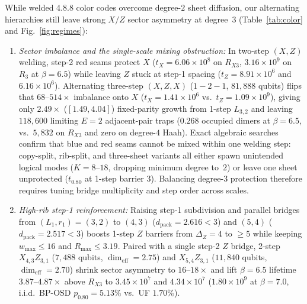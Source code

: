 \documentclass[aps,prx,reprint,superscriptaddress,nofootinbib,floatfix]{revtex4-2}
\begin{document}
While welded 4.8.8 color codes overcome degree-$2$ sheet diffusion, our alternating hierarchies still leave strong $X/Z$ sector asymmetry at degree~$3$ (Table~\ref{tab:color} and Fig.~\ref{fig:regimes}):
\begin{enumerate}
  \item \emph{Sector imbalance and the single-scale mixing obstruction:} In two-step $(X, Z)$ welding, step-2 red seams protect $X$ ($t_X = 6.06 \times 10^8$ on $R_{X3}$, $3.16 \times 10^9$ on $R_3$ at $\beta = 6.5$) while leaving $Z$ stuck at step-1 spacing ($t_Z = 8.91 \times 10^6$ and $6.16 \times 10^6$). Alternating three-step $(X, Z, X)$ ($1{-}2{-}1$, $81{,}888$ qubits) flips that $68\text{--}514\times$ imbalance onto $X$ ($t_X = 1.41 \times 10^6$ vs.\ $t_Z = 1.09 \times 10^9$), giving only $2.49\times$ ($[1.49, 4.04]$) fixed-parity growth from 1-step $L_{3,2}$ and leaving $118{,}600$ limiting $E = 2$ adjacent-pair traps ($0.268$ occupied dimers at $\beta = 6.5$, vs.\ $5{,}832$ on $R_{X3}$ and zero on degree-$4$ Haah). Exact algebraic searches confirm that blue and red seams cannot be mixed within one welding step: copy-split, rib-split, and three-sheet variants all either spawn unintended logical modes ($K = 8\text{--}18$, dropping minimum degree to~$2$) or leave one sheet unprotected ($t_{0.80}$ at 1-step barrier $3$). Balancing degree-$3$ protection therefore requires tuning bridge multiplicity and step order across scales.
  \item \emph{High-rib step-1 reinforcement:} Raising step-1 subdivision and parallel bridges from $(L_1, r_1) = (3, 2)$ to $(4, 3)$ ($d_{\mathrm{pack}} = 2.616 < 3$) and $(5, 4)$ ($d_{\mathrm{pack}} = 2.517 < 3$) boosts 1-step $Z$ barriers from $\Delta_Z = 4$ to $\ge 5$ while keeping $w_{\max} \le 16$ and $R_{\max} \le 3.19$. Paired with a single step-2 $Z$ bridge, 2-step $X_{4,3} Z_{3,1}$ ($7{,}488$ qubits, $\dim_{\mathrm{eff}} = 2.75$) and $X_{5,4} Z_{3,1}$ ($11{,}840$ qubits, $\dim_{\mathrm{eff}} = 2.70$) shrink sector asymmetry to $16\text{--}18\times$ and lift $\beta = 6.5$ lifetime $3.87\text{--}4.87\times$ above $R_{X3}$ to $3.45 \times 10^7$ and $4.34 \times 10^7$ ($1.80 \times 10^9$ at $\beta = 7.0$, i.i.d.\ BP-OSD $p_{0.80} = 5.13\%$ vs.\ UF $1.70\%$).

\end{enumerate}
\end{document}
